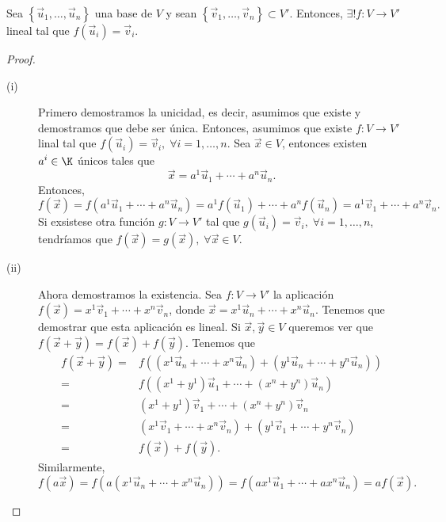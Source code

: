 \begin{ftheorem}[]
	\normalfont Sea $\displaystyle \left\{ \vec{u}_{1}, \ldots, \vec{u}_{n}\right\}  $ una base de $\displaystyle V $ y sean $\displaystyle \left\{ \vec{v}_{1}, \ldots, \vec{v}_{n}\right\} \subset V' $. Entonces, $\displaystyle \exists! f : V \to V' $ lineal tal que $\displaystyle f\left(\vec{u}_{i}\right) = \vec{v}_{i} $.
\end{ftheorem}

\begin{proof}
\begin{description}
\item[(i)] Primero demostramos la unicidad, es decir, asumimos que existe y demostramos que debe ser única. Entonces, asumimos que existe $\displaystyle f : V \to V' $ linal tal que $\displaystyle f\left(\vec{u}_{i}\right) = \vec{v}_{i}, \; \forall i = 1, \ldots, n $. Sea $\displaystyle \vec{x}\in V $, entonces existen $\displaystyle a^{i} \in \K $ únicos tales que 
	\[\vec{x} = a^{1}\vec{u}_{1} + \cdots + a^{n}\vec{u}_{n} .\]
Entonces, 
\[f\left(\vec{x}\right) = f\left(a^{1}\vec{u}_{1} + \cdots + a^{n}\vec{u}_{n}\right) = a^{1}f\left(\vec{u}_{1}\right) + \cdots + a^{n}f\left(\vec{u}_{n}\right) = a^{1}\vec{v}_{1} + \cdots + a^{n}\vec{v}_{n}.\]
Si exsistese otra función $\displaystyle g : V \to V' $ tal que $\displaystyle g\left(\vec{u}_{i}\right) = \vec{v}_{i}, \; \forall i = 1, \ldots, n $, tendríamos que $\displaystyle f\left(\vec{x}\right) = g\left(\vec{x}\right), \; \forall \vec{x} \in V $.
\item[(ii)] Ahora demostramos la existencia. Sea $\displaystyle f : V \to V' $ la aplicación $\displaystyle f\left(\vec{x}\right) = x^{1}\vec{v}_{1} + \cdots + x^{n}\vec{v}_{n} $, donde $\displaystyle \vec{x} = x^{1}\vec{u}_{n} + \cdots + x^{n}\vec{u}_{n} $. Tenemos que demostrar que esta aplicación es lineal. Si $\displaystyle \vec{x}, \vec{y} \in V $ queremos ver que $\displaystyle f\left(\vec{x}+\vec{y}\right) = f\left(\vec{x}\right) + f\left(\vec{y}\right) $. Tenemos que
\[
\begin{split}
	f\left(\vec{x}+\vec{y}\right) = & f\left(\left(x^{1}\vec{u}_{n} + \cdots + x^{n}\vec{u}_{n}\right) + \left(y^{1}\vec{u}_{n} + \cdots + y^{n}\vec{u}_{n}\right)\right) \\
	= & f\left(\left(x^{1}+y^{1}\right)\vec{u}_{1} + \cdots + \left(x^{n}+y^{n}\right)\vec{u}_{n}\right) \\
	= & \left(x^{1}+y^{1}\right)\vec{v}_{1} + \cdots + \left(x^{n} + y^{n}\right) \vec{v}_{n} \\
	= & \left(x^{1}\vec{v}_{1} + \cdots + x^{n}\vec{v}_{n}\right) + \left(y^{1}\vec{v}_{1} + \cdots + y^{n}\vec{v}_{n}\right) \\
	= & f\left(\vec{x}\right) + f\left(\vec{y}\right).
\end{split}
\]
Similarmente, 
\[f\left(a\vec{x}\right) = f\left(a\left(x^{1}\vec{u}_{n} + \cdots + x^{n}\vec{u}_{n}\right)\right)= f\left(ax^{1}\vec{u}_{1} + \cdots + ax^{n}\vec{u}_{n}\right) = a f\left(\vec{x}\right) .\]
\end{description}
\end{proof}

